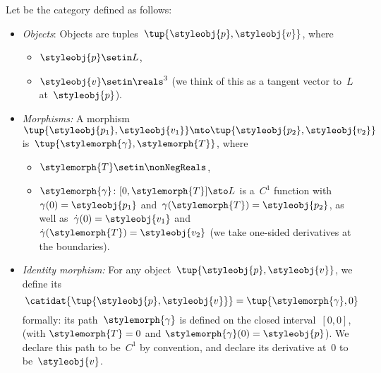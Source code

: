 \begin{definition}[\Berg]
    \label{def:Berg}
    Let \Berg be the category defined as follows:
    \begin{itemize}
        \item \emph{Objects}: Objects are tuples~$\tup{\styleobj{p},\styleobj{v}}$, where
              \begin{itemize}
                  \item $\styleobj{p} \setin L$,
                  \item $\styleobj{v} \setin \reals^3$ (we think of this as a tangent vector to~$L$ at~$\styleobj{p}$).
              \end{itemize}

        \item \emph{Morphisms:}
              A morphism~$\tup{\styleobj{p_1}, \styleobj{v_1}} \mto \tup{\styleobj{p_2}, \styleobj{v_2}}$ is~$\tup{\stylemorph{\gamma}, \stylemorph{T}}$,
              where
              \begin{itemize}
                  \item $\stylemorph{T} \setin \nonNegReals$,
                  \item $\stylemorph{\gamma} \colon [0, \stylemorph{T}] \sto L$ is a~$C^1$ function with~$\gamma(0)=\styleobj{p_1}$ and~$\gamma(\stylemorph{T})=\styleobj{p_2}$, as well as~$\dot \gamma(0) = \styleobj{v_1}$ and~$\dot \gamma(\stylemorph{T}) = \styleobj{v_2}$  (we take one-sided derivatives at the boundaries).
              \end{itemize}
        \item \emph{Identity morphism:}
              For any object~$\tup{\styleobj{p}, \styleobj{v}}$, we define its  \begin{equation}
                  \catidat{\tup{\styleobj{p},\styleobj{v}}} = \tup{\stylemorph{\gamma}, 0}
              \end{equation}
              formally: its path~$\stylemorph{\gamma}$ is defined on the closed interval~$[0,0]$, (with $\stylemorph{T}=0$ and $\stylemorph{\gamma}(0) = \styleobj{p}$).
              We declare this path to be~$C^1$ by convention, and declare its derivative at~$0$ to be~$\styleobj{v}$.


\end{itemize}
\end{definition}
